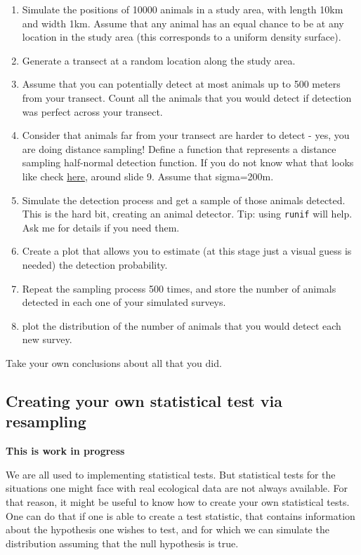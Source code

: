 \documentclass[
]{article}
\begin{document}
\begin{enumerate}
\def\labelenumi{\arabic{enumi}.}
\item
  Simulate the positions of 10000 animals in a study area, with length
  10km and width 1km. Assume that any animal has an equal chance to be
  at any location in the study area (this corresponds to a uniform
  density surface).
\item
  Generate a transect at a random location along the study area.
\item
  Assume that you can potentially detect at most animals up to 500
  meters from your transect. Count all the animals that you would detect
  if detection was perfect across your transect.
\item
  Consider that animals far from your transect are harder to detect -
  yes, you are doing distance sampling! Define a function that
  represents a distance sampling half-normal detection function. If you
  do not know what that looks like check
  \href{https://workshops.distancesampling.org/online-course/lecturepdfs/Ch1/L1-4\%20Choosing\%20a\%20Detection\%20Function.pdf}{here},
  around slide 9. Assume that sigma=200m.
\item
  Simulate the detection process and get a sample of those animals
  detected. This is the hard bit, creating an animal detector. Tip:
  using \texttt{runif} will help. Ask me for details if you need them.
\item
  Create a plot that allows you to estimate (at this stage just a visual
  guess is needed) the detection probability.
\item
  Repeat the sampling process 500 times, and store the number of animals
  detected in each one of your simulated surveys.
\item
  plot the distribution of the number of animals that you would detect
  each new survey.
\end{enumerate}

Take your own conclusions about all that you did.

\subsection{Creating your own statistical test via
resampling}\label{creating-your-own-statistical-test-via-resampling}

\textbf{This is work in progress}

We are all used to implementing statistical tests. But statistical tests
for the situations one might face with real ecological data are not
always available. For that reason, it might be useful to know how to
create your own statistical tests. One can do that if one is able to
create a test statistic, that contains information about the hypothesis
one wishes to test, and for which we can simulate the distribution
assuming that the null hypothesis is true.
\end{document}
